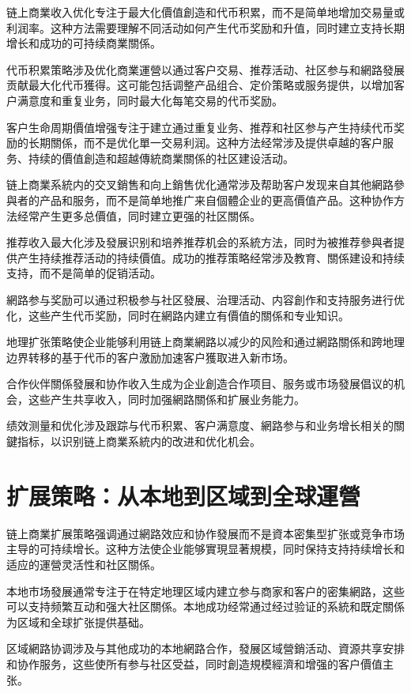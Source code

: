 \documentclass[
  Letterpaper,
]{scrbook}
\begin{document}
链上商業收入优化专注于最大化價值創造和代币积累，而不是简单地增加交易量或利润率。这种方法需要理解不同活动如何产生代币奖励和升值，同时建立支持长期增长和成功的可持续商業關係。

代币积累策略涉及优化商業運營以通过客户交易、推荐活动、社区参与和網路發展贡献最大化代币獲得。这可能包括调整产品组合、定价策略或服务提供，以增加客户满意度和重复业务，同时最大化每笔交易的代币奖励。

客户生命周期價值增强专注于建立通过重复业务、推荐和社区参与产生持续代币奖励的长期關係，而不是优化單一交易利润。这种方法经常涉及提供卓越的客户服务、持续的價值創造和超越傳統商業關係的社区建设活动。

链上商業系統内的交叉銷售和向上銷售优化通常涉及帮助客户发现来自其他網路參與者的产品和服务，而不是简单地推广来自個體企业的更高價值产品。这种协作方法经常产生更多总價值，同时建立更强的社区關係。

推荐收入最大化涉及發展识别和培养推荐机会的系統方法，同时为被推荐參與者提供产生持续推荐活动的持续價值。成功的推荐策略经常涉及教育、關係建设和持续支持，而不是简单的促销活动。

網路参与奖励可以通过积极参与社区發展、治理活动、内容創作和支持服务进行优化，这些产生代币奖励，同时在網路内建立有價值的關係和专业知识。

地理扩张策略使企业能够利用链上商業網路以减少的风险和通过網路關係和跨地理边界转移的基于代币的客户激励加速客户獲取进入新市场。

合作伙伴關係發展和协作收入生成为企业創造合作项目、服务或市场發展倡议的机会，这些产生共享收入，同时加强網路關係和扩展业务能力。

绩效测量和优化涉及跟踪与代币积累、客户满意度、網路参与和业务增长相关的關鍵指标，以识别链上商業系統内的改进和优化机会。

\section{扩展策略：从本地到区域到全球運營}\label{ux6269ux5c55ux7b56ux7565ux4eceux672cux5730ux5230ux533aux57dfux5230ux5168ux7403ux904bux71df}

链上商業扩展策略强调通过網路效应和协作發展而不是資本密集型扩张或竞争市场主导的可持续增长。这种方法使企业能够實現显著規模，同时保持支持持续增长和适应的運營灵活性和社区關係。

本地市场發展通常专注于在特定地理区域内建立参与商家和客户的密集網路，这些可以支持频繁互动和强大社区關係。本地成功经常通过经过验证的系統和既定關係为区域和全球扩张提供基础。

区域網路协调涉及与其他成功的本地網路合作，發展区域營銷活动、資源共享安排和协作服务，这些使所有参与社区受益，同时創造規模經濟和增强的客户價值主张。
\end{document}
